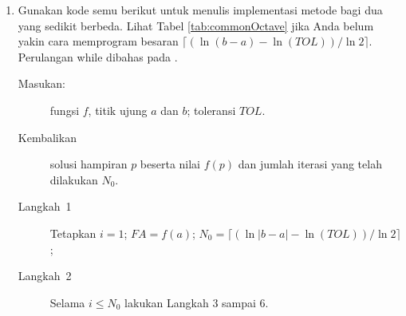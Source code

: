 \begin{enumerate}
\begin{enumerate}
\item Terapkan algoritma ini pada fungsi $f(x)=(x)(x-2)(x+2)$ pada interval
$[-3,3]$. Akar manakah yang akan dihampiri algoritma ini?
\item Berapakah batas galat yang dijamin bagi hampiran tersebut menurut
rumus
\[
|p_{n}-p|\leq\frac{b-a}{2^{n}}?
\]
\item Seberapa akurat hampiran tersebut sebenarnya? Bandingkan dengan batas
pada (b).
\item Ubahlah algoritma agar dapat menghampiri akar yang berbeda dengan
menggunakan interval awal yang sama.
\item Ubahlah algoritma agar tidak menggunakan perkalian.
\end{enumerate}
\item \label{bisectionCode-1}Gunakan kode semu berikut untuk menulis implementasi
metode bagi dua yang sedikit berbeda. Lihat Tabel \ref{tab:commonOctave}
jika Anda belum yakin cara memprogram besaran $\lceil(\ln(b-a)-\ln(TOL))/\ln2\rceil$.
Perulangan while dibahas pada .

\begin{description}
\item [{Masukan:}] fungsi $f$, titik ujung $a$ dan $b$; toleransi $TOL$.
\item [{Kembalikan}] solusi hampiran $p$ beserta nilai $f(p)$ dan jumlah
iterasi yang telah dilakukan $N_{0}$.
\item [{Langkah~1}] Tetapkan $i=1$; $FA=f(a)$; $N_{0}=\lceil(\ln|b-a|-\ln(TOL))/\ln2\rceil$;
\item [{Langkah~2}] Selama $i\leq N_{0}$ lakukan Langkah 3 sampai 6.


\end{description}
\end{enumerate}

